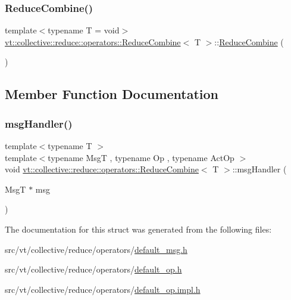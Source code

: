 \subsubsection{\texorpdfstring{Reduce\+Combine()}{ReduceCombine()}}
{\footnotesize\ttfamily template$<$typename T = void$>$ \\
\hyperlink{structvt_1_1collective_1_1reduce_1_1operators_1_1_reduce_combine}{vt\+::collective\+::reduce\+::operators\+::\+Reduce\+Combine}$<$ T $>$\+::\hyperlink{structvt_1_1collective_1_1reduce_1_1operators_1_1_reduce_combine}{Reduce\+Combine} (\begin{DoxyParamCaption}{ }\end{DoxyParamCaption})\hspace{0.3cm}{\ttfamily [default]}}



\subsection{Member Function Documentation}
\mbox{\label{structvt_1_1collective_1_1reduce_1_1operators_1_1_reduce_combine_aa1657dc492475bc1d82d1dc282ee37ce}} 
\subsubsection{\texorpdfstring{msg\+Handler()}{msgHandler()}}
{\footnotesize\ttfamily template$<$typename T $>$ \\
template$<$typename MsgT , typename Op , typename Act\+Op $>$ \\
void \hyperlink{structvt_1_1collective_1_1reduce_1_1operators_1_1_reduce_combine}{vt\+::collective\+::reduce\+::operators\+::\+Reduce\+Combine}$<$ T $>$\+::msg\+Handler (\begin{DoxyParamCaption}\item[{MsgT $\ast$}]{msg }\end{DoxyParamCaption})\hspace{0.3cm}{\ttfamily [static]}}



The documentation for this struct was generated from the following files\+:\begin{DoxyCompactItemize}
\item 
src/vt/collective/reduce/operators/\hyperlink{default__msg_8h}{default\+\_\+msg.\+h}\item 
src/vt/collective/reduce/operators/\hyperlink{default__op_8h}{default\+\_\+op.\+h}\item 
src/vt/collective/reduce/operators/\hyperlink{default__op_8impl_8h}{default\+\_\+op.\+impl.\+h}\end{DoxyCompactItemize}
